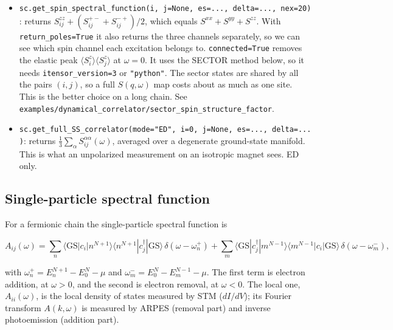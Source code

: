 \documentclass[11pt]{article}
\providecommand{\tightlist}{\setlength{\itemsep}{0pt}\setlength{\parskip}{0pt}}
\begin{document}
\begin{itemize}
\tightlist
\item
  \texttt{sc.\allowbreak{}get\_\allowbreak{}spin\_\allowbreak{}spectral\_\allowbreak{}function(i,\ j=None,\ es=.\allowbreak{}.\allowbreak{}.\allowbreak{},\ delta=.\allowbreak{}.\allowbreak{}.\allowbreak{},\ nex=20)}:
  returns \(S^{zz}_{ij}+(S^{+-}_{ij}+S^{-+}_{ij})/2\), which equals
  \(S^{xx}+S^{yy}+S^{zz}\). With \texttt{return\_\allowbreak{}poles=True} it also returns the
  three channels separately, so we can see which spin channel each
  excitation belongs to. \texttt{connected=True} removes the elastic peak
  \(\langle S^z_i\rangle\langle S^z_j\rangle\) at \(\omega=0\). It uses the
  SECTOR method below, so it needs \texttt{itensor\_\allowbreak{}version=3} or \texttt{"python"}.
  The sector states are shared by all the pairs \((i,j)\), so a full
  \(S(q,\omega)\) map costs about as much as one site. This is the better
  choice on a long chain. See \texttt{examples/dynamical\_\allowbreak{}correlator/sector\_\allowbreak{}spin\_\allowbreak{}structure\_\allowbreak{}factor}.
\item
  \texttt{sc.\allowbreak{}get\_\allowbreak{}full\_\allowbreak{}SS\_\allowbreak{}correlator(mode="ED",\ i=0,\ j=None,\ es=.\allowbreak{}.\allowbreak{}.\allowbreak{},\ delta=.\allowbreak{}.\allowbreak{}.\allowbreak{})}:
  returns \(\frac13\sum_\alpha S^{\alpha\alpha}_{ij}(\omega)\), averaged over a
  degenerate ground-state manifold. This is what an unpolarized measurement
  on an isotropic magnet sees. ED only.
\end{itemize}

\subsection{Single-particle spectral function}

For a fermionic chain the single-particle spectral function is

\[A_{ij}(\omega)=\sum_n\langle\mathrm{GS}|c_i|n^{N+1}\rangle\langle n^{N+1}|c_j^\dagger|\mathrm{GS}\rangle\,\delta(\omega-\omega_n^+)
+\sum_m\langle\mathrm{GS}|c_j^\dagger|m^{N-1}\rangle\langle m^{N-1}|c_i|\mathrm{GS}\rangle\,\delta(\omega-\omega_m^-),\]

with \(\omega_n^+=E_n^{N+1}-E_0^N-\mu\) and
\(\omega_m^-=E_0^N-E_m^{N-1}-\mu\). The first term is electron addition, at
\(\omega>0\), and the second is electron removal, at \(\omega<0\). The local
one, \(A_{ii}(\omega)\), is the local density of states measured by STM
(\(dI/dV\)); its Fourier transform \(A(k,\omega)\) is measured by ARPES
(removal part) and inverse photoemission (addition part).
\end{document}

